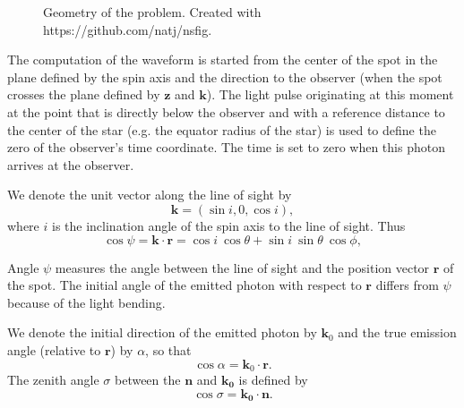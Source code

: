 \documentclass{wihuri}
\def\be{\begin{equation}}
\def\ee{\end{equation}}
\newcommand{\bmath}[1]{\boldsymbol{#1}}
\begin{document}
\begin{figure}
\centerline{}
\caption{Geometry of the problem. Created with https://github.com/natj/nsfig. %
\label{fig:geom2}}
\end{figure}



The computation of the waveform is started from the center of the spot in the plane defined by the spin axis and the direction to the observer 
(when the spot crosses the plane defined by $\bmath{z}$ and $\bmath{k}$). The light pulse originating at this moment at the point that is directly below the observer and with a reference distance to the center of the star (e.g. the equator radius of the star) is used to define the zero of the observer's time coordinate. The time is set to zero when this photon arrives at the observer. 



We denote the unit vector along the line of sight by 
\be
\bmath{k}=(\sin i, 0, \cos i), 
\ee 
where $i$ is the inclination angle of the spin axis to the line of sight. 
Thus 
\be \label{eq:psi2}
  \cos\psi=\bmath{k}\cdot \bmath{r} = \cos i\ \cos\theta+\sin i\ \sin \theta\ \cos\phi,
\ee

Angle $\psi$ measures the angle between the line of sight and the position vector $\bmath{r}$ of the spot. The initial angle of the emitted photon with respect to
 ${\mathbf r}$ differs from $\psi$ because of the light bending.



We denote the initial direction of the emitted photon by $\bmath{k}_0$ %
and the true emission angle (relative to $\bmath{r}$) by $\alpha$, so that
\be
 \cos\alpha=\bmath{k}_0 \cdot \bmath{r}.
\ee
The zenith angle $\sigma$ between the $\bmath{n}$ and $\bmath{k_{0}}$ is defined by 
\be
\cos\sigma = \bmath{k_{0}}\cdot\bmath{n}.
\ee
\end{document}

